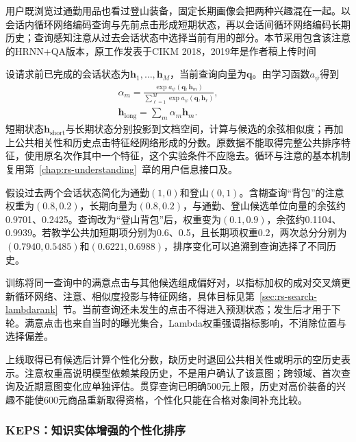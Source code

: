 用户既浏览过通勤用品也看过登山装备，固定长期画像会把两种兴趣混在一起。以会话内循环网络编码查询与先前点击形成短期状态，再以会话间循环网络编码长期历史；查询感知注意从过去会话状态中选择当前有用的部分。本节采用包含该注意的HRNN+QA版本，原工作发表于CIKM 2018，2019年是作者稿上传时间

设请求前已完成的会话状态为$\bm h_1,\ldots,\bm h_M$，当前查询向量为$\bm q$。由学习函数$a_\psi$得到
\begin{equation}
 \begin{split}
 \alpha_m=\frac{\exp a_\psi(\bm q,\bm h_m)}
 {\sum_{\ell=1}^{M}\exp a_\psi(\bm q,\bm h_\ell)},\qquad\\
 \bm h_{\mathrm{long}}=\sum_m\alpha_m\bm h_m .
 \end{split}
 \label{eq:rs-search-hrnn}
\end{equation}
短期状态$\bm h_{\mathrm{short}}$与长期状态分别投影到文档空间，计算与候选的余弦相似度；再加上公共相关性和历史点击特征经网络形成的分数。原数据不能取得完整公共排序特征，使用原名次作其中一个特征，这个实验条件不应隐去。循环与注意的基本机制复用第~\ref{chap:rs-understanding}~章的用户信息接口及。

假设过去两个会话状态简化为通勤$(1,0)$和登山$(0,1)$。含糊查询“背包”的注意权重为$(0.8,0.2)$，长期向量为$(0.8,0.2)$，与通勤、登山候选单位向量的余弦约0.9701、0.2425。查询改为“登山背包”后，权重变为$(0.1,0.9)$，余弦约0.1104、0.9939。若教学公共加短期项分别为0.6、0.5，且长期项权重0.2，两次总分分别为$(0.7940,0.5485)$和$(0.6221,0.6988)$，排序变化可以追溯到查询选择了不同历史。

训练将同一查询中的满意点击与其他候选组成偏好对，以指标加权的成对交叉熵更新循环网络、注意、相似度投影与特征网络，具体目标见第~\ref{sec:rs-search-lambdarank}~节。当前查询还未发生的点击不得进入预测状态；发生后才用于下轮。满意点击也来自当时的曝光集合，Lambda权重强调指标影响，不消除位置与选择偏差。

上线取得已有候选后计算个性化分数，缺历史时退回公共相关性或明示的空历史表示。注意权重高说明模型依赖某段历史，不是用户确认了该意图；跨领域、首次查询及近期意图变化应单独评估。贯穿查询已明确500元上限，历史对高价装备的兴趣不能使600元商品重新取得资格，个性化只能在合格对象间补充比较。

\Needspace{100mm}
\subsubsection{KEPS：知识实体增强的个性化排序}
\label{sec:rs-search-keps}

